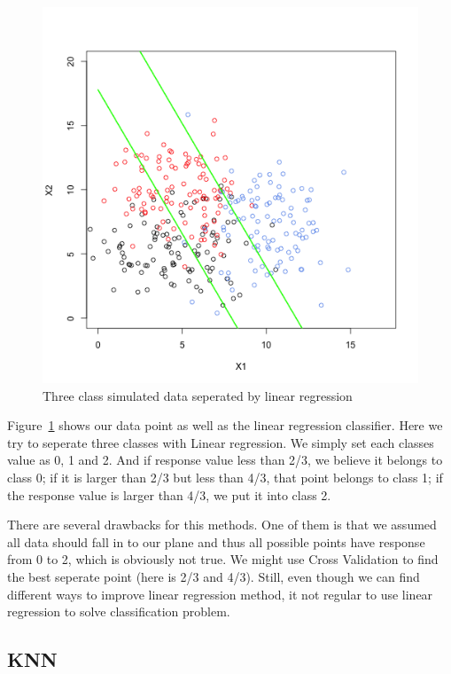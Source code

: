 \documentclass{article}\usepackage[]{graphicx}\usepackage[]{color}
\newenvironment{knitrout}{}{} %
\begin{document}
\begin{knitrout}
\begin{figure}[]
{\centering \includegraphics[width=.7\linewidth]{figure/linear-classifier} 

}

\caption[Three class simulated data seperated by linear regression]{Three class simulated data seperated by linear regression\label{fig:linear-classifier}}
\end{figure}


\end{knitrout}


Figure~\ref{fig:linear-classifier} shows our data point as well as the linear regression classifier. Here we try to seperate three classes with Linear regression. We simply set each classes value as 0, 1 and 2. And if response value less than 2/3, we believe it belongs to class 0; if it is larger than 2/3 but less than 4/3, that point belongs to class 1; if the response value is larger than 4/3, we put it into class 2.

There are several drawbacks for this methods. One of them is that we assumed all data should fall in to our plane and thus all possible points have response from 0 to 2, which is obviously not true. We might use Cross Validation to find the best seperate point (here is 2/3 and 4/3). Still, even though we can find different ways to improve linear regression method, it not regular to use linear regression to solve classification problem.

\subsection{KNN}
\label{knn}
\end{document}
